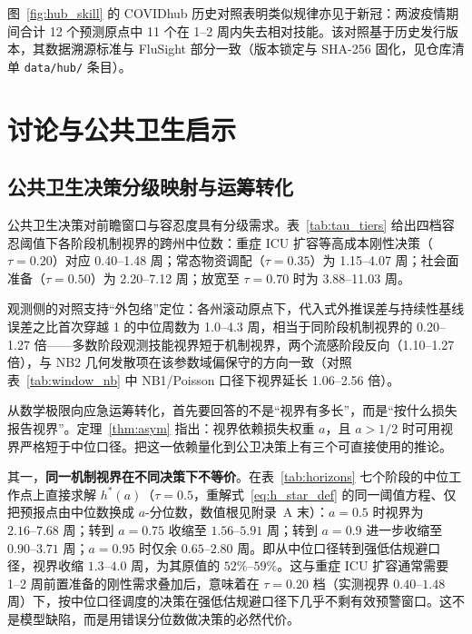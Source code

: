\documentclass[10pt,UTF8,a4paper,zihao=-4]{ctexart}
\theoremstyle{plain}
\theoremstyle{definition}
\theoremstyle{remark}
\begin{document}
图~\ref{fig:hub_skill} 的 COVIDhub 历史对照表明类似规律亦见于新冠：两波疫情期间合计 12 个预测原点中 11 个在 1--2 周内失去相对技能。该对照基于历史发行版本，其数据溯源标准与 FluSight 部分一致（版本锁定与 SHA-256 固化，见仓库清单 \texttt{data/hub/} 条目）。

\section{讨论与公共卫生启示}\label{sec:discussion}

\subsection{公共卫生决策分级映射与运筹转化}\label{sec:operational}

公共卫生决策对前瞻窗口与容忍度具有分级需求。表~\ref{tab:tau_tiers} 给出四档容忍阈值下各阶段机制视界的跨州中位数：重症 ICU 扩容等高成本刚性决策（$\tau = 0.20$）对应 0.40--1.48 周；常态物资调配（$\tau = 0.35$）为 1.15--4.07 周；社会面准备（$\tau = 0.50$）为 2.20--7.12 周；放宽至 $\tau = 0.70$ 时为 3.88--11.03 周。

\begin{table}[htbp]
\centering
\footnotesize
\caption{四档容忍阈值下的机制视界跨州中位数（周，5 周基准窗口，$\tau=0.50$ 口径与表~\ref{tab:horizons} 一致）}
\label{tab:tau_tiers}
\setlength{\tabcolsep}{5pt}

\end{table}

观测侧的对照支持“外包络”定位：各州滚动原点下，代入式外推误差与持续性基线误差之比首次穿越 1 的中位周数为 1.0--4.3 周，相当于同阶段机制视界的 0.20--1.27 倍——多数阶段观测技能视界短于机制视界，两个流感阶段反向（1.10--1.27 倍），与 NB2 几何发散项在该参数域偏保守的方向一致（对照表~\ref{tab:window_nb} 中 NB1/Poisson 口径下视界延长 1.06--2.56 倍）。

从数学极限向应急运筹转化，首先要回答的不是“视界有多长”，而是“按什么损失报告视界”。定理~\ref{thm:asym} 指出：视界依赖损失权重 $a$，且 $a>1/2$ 时可用视界严格短于中位口径。把这一依赖量化到公卫决策上有三个可直接使用的推论。

其一，\textbf{同一机制视界在不同决策下不等价}。在表~\ref{tab:horizons} 七个阶段的中位工作点上直接求解 $h^*(a)$（$\tau=0.5$，重解式~\eqref{eq:h_star_def} 的同一阈值方程、仅把预报点由中位数换成 $a$-分位数，数值根见附录~A 末）：$a=0.5$ 时视界为 $2.16\text{--}7.68$ 周；转到 $a=0.75$ 收缩至 $1.56\text{--}5.91$ 周；转到 $a=0.9$ 进一步收缩至 $0.90\text{--}3.71$ 周；$a=0.95$ 时仅余 $0.65\text{--}2.80$ 周。即从中位口径转到强低估规避口径，视界收缩 $1.3\text{--}4.0$ 周，为其原值的 $52\%\text{--}59\%$。这与重症 ICU 扩容通常需要 1--2 周前置准备的刚性需求叠加后，意味着在 $\tau=0.20$ 档（实测视界 $0.40\text{--}1.48$ 周）下，按中位口径调度的决策在强低估规避口径下几乎不剩有效预警窗口。这不是模型缺陷，而是用错误分位数做决策的必然代价。
\end{document}
